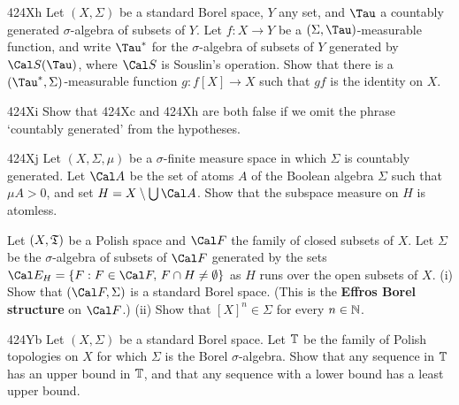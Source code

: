 {\spheader 424Xh Let $(X,\Sigma)$ be a standard Borel space, $Y$ any set,
and $\Tau$ a countably generated $\sigma$-algebra of subsets of $Y$.
Let $f:X\to Y$ be a $(\Sigma,\Tau)$-measurable function, and write
$\Tau^*$ for the $\sigma$-algebra of subsets of $Y$ generated by
$\Cal S(\Tau)$, where $\Cal S$ is Souslin's
operation.    Show that there is a
$(\Tau^*,\Sigma)$-measurable function $g:f[X]\to X$ such that $gf$ is
the identity on $X$.   

\sqheader 424Xi Show that 424Xc and 424Xh are both false if we omit the
phrase `countably generated' from the hypotheses.   

\spheader 424Xj Let $(X,\Sigma,\mu)$ be a
$\sigma$-finite measure space in which $\Sigma$
is countably generated.   Let $\Cal A$ be the set of atoms $A$ of
the Boolean algebra $\Sigma$
such that $\mu A>0$, and set $H=X\setminus\bigcup\Cal A$.   Show that the
subspace measure on $H$ is atomless.

Let $(X,\frak T)$ be a Polish space and $\Cal F$ the family of closed
subsets of $X$.   Let $\Sigma$ be the $\sigma$-algebra of subsets of
$\Cal F$ generated by the sets
$\Cal E_H=\{F:F\in\Cal F,\,F\cap H\ne\emptyset\}$ as $H$ runs over the
open subsets of $X$.   (i) Show
that $(\Cal F,\Sigma)$ is a standard Borel space.      (This is the
{\bf Effros Borel structure} on $\Cal F$.)   (ii) Show that
$[X]^n\in\Sigma$ for every $n\in\Bbb N$.

\spheader 424Yb Let $(X,\Sigma)$ be a standard Borel space.   Let
$\Bbb T$ be the family of Polish topologies on $X$ for which $\Sigma$ is
the Borel $\sigma$-algebra.   Show that any sequence in $\Bbb T$ has an
upper bound in $\Bbb T$, and that any sequence with a lower bound has a
least upper bound.

}

